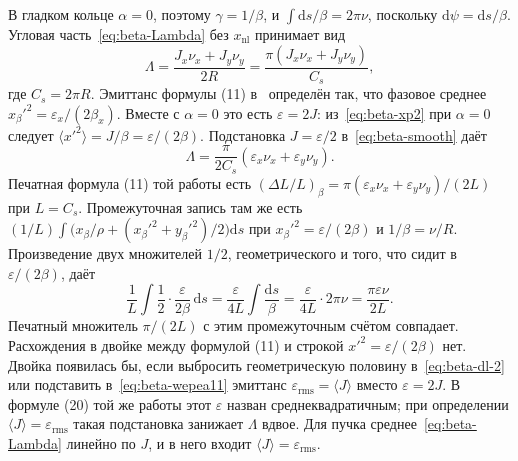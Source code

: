 В гладком кольце $\alpha=0$, поэтому $\gamma=1/\beta$, и $\int\mathrm{d}s/\beta=2\pi\nu$, поскольку $\mathrm{d}\psi=\mathrm{d}s/\beta$. Угловая часть~\eqref{eq:beta-Lambda} без $x_{\mathrm{nl}}$ принимает вид
\begin{equation}
\label{eq:beta-smooth}
\Lambda
=\frac{J_x\nu_x+J_y\nu_y}{2R}
=\frac{\pi(J_x\nu_x+J_y\nu_y)}{C_s},
\end{equation}
где $C_s=2\pi R$. Эмиттанс формулы (11) в~\cite{Senichev2013} определён так, что фазовое среднее $x_\beta'^2=\varepsilon_x/(2\beta_x)$. Вместе с $\alpha=0$ это есть $\varepsilon=2J$: из~\eqref{eq:beta-xp2} при $\alpha=0$ следует $\langle x'^2\rangle=J/\beta=\varepsilon/(2\beta)$. Подстановка $J=\varepsilon/2$ в~\eqref{eq:beta-smooth} даёт
\begin{equation}
\label{eq:beta-wepea11}
\Lambda
=\frac{\pi}{2C_s}(\varepsilon_x\nu_x+\varepsilon_y\nu_y).
\end{equation}
Печатная формула (11) той работы есть $(\Delta L/L)_\beta=\pi(\varepsilon_x\nu_x+\varepsilon_y\nu_y)/(2L)$ при $L=C_s$. Промежуточная запись там же есть $(1/L)\int\bigl(x_\beta/\rho+(x_\beta'^2+y_\beta'^2)/2\bigr)\mathrm{d}s$ при $x_\beta'^2=\varepsilon/(2\beta)$ и $1/\beta=\nu/R$. Произведение двух множителей $1/2$, геометрического и того, что сидит в $\varepsilon/(2\beta)$, даёт
\begin{equation}
\label{eq:beta-wepea-alg}
\frac{1}{L}\int\frac{1}{2}\cdot\frac{\varepsilon}{2\beta}\,\mathrm{d}s
=\frac{\varepsilon}{4L}\int\frac{\mathrm{d}s}{\beta}
=\frac{\varepsilon}{4L}\cdot 2\pi\nu
=\frac{\pi\varepsilon\nu}{2L}.
\end{equation}
Печатный множитель $\pi/(2L)$ с этим промежуточным счётом совпадает. Расхождения в двойке между формулой (11) и строкой $x'^2=\varepsilon/(2\beta)$ нет. Двойка появилась бы, если выбросить геометрическую половину в~\eqref{eq:beta-dl-2} или подставить в~\eqref{eq:beta-wepea11} эмиттанс $\varepsilon_{\mathrm{rms}}=\langle J\rangle$ вместо $\varepsilon=2J$. В формуле (20) той же работы этот $\varepsilon$ назван среднеквадратичным; при определении $\langle J\rangle=\varepsilon_{\mathrm{rms}}$ такая подстановка занижает $\Lambda$ вдвое. Для пучка среднее~\eqref{eq:beta-Lambda} линейно по $J$, и в него входит $\langle J\rangle=\varepsilon_{\mathrm{rms}}$.


